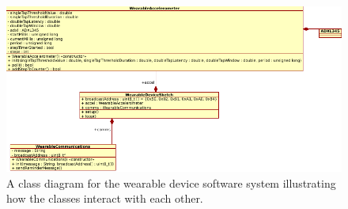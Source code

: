 \begin{figure}[H]
	\centering
	\captionsetup{width=1.0\linewidth}


	\includegraphics[width=1.0\linewidth]{./UML/WearableDevice/class diagram.png}

	\caption[Wearable Device Class Diagram]{A class diagram for the wearable device software system illustrating how the classes interact with each other.}

	\label{fig:class_diagram_wearable}

\end{figure}
